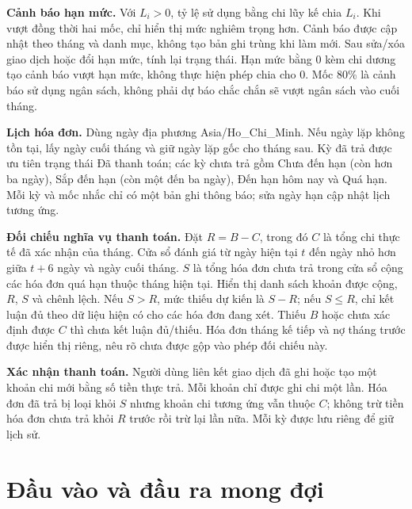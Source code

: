 \documentclass[11pt,a4paper]{article}
\begin{document}
\textbf{Cảnh báo hạn mức.} Với $L_i>0$, tỷ lệ sử dụng bằng chi lũy kế chia $L_i$. Khi vượt đồng thời hai mốc, chỉ hiển thị mức nghiêm trọng hơn. Cảnh báo được cập nhật theo tháng và danh mục, không tạo bản ghi trùng khi làm mới. Sau sửa/xóa giao dịch hoặc đổi hạn mức, tính lại trạng thái. Hạn mức bằng 0 kèm chi dương tạo cảnh báo vượt hạn mức, không thực hiện phép chia cho 0. Mốc 80\% là cảnh báo sử dụng ngân sách, không phải dự báo chắc chắn sẽ vượt ngân sách vào cuối tháng.

\textbf{Lịch hóa đơn.} Dùng ngày địa phương Asia/Ho\_Chi\_Minh. Nếu ngày lặp không tồn tại, lấy ngày cuối tháng và giữ ngày lặp gốc cho tháng sau. Kỳ đã trả được ưu tiên trạng thái Đã thanh toán; các kỳ chưa trả gồm Chưa đến hạn (còn hơn ba ngày), Sắp đến hạn (còn một đến ba ngày), Đến hạn hôm nay và Quá hạn. Mỗi kỳ và mốc nhắc chỉ có một bản ghi thông báo; sửa ngày hạn cập nhật lịch tương ứng.

\textbf{Đối chiếu nghĩa vụ thanh toán.} Đặt $R=B-C$, trong đó $C$ là tổng chi thực tế đã xác nhận của tháng. Cửa sổ đánh giá từ ngày hiện tại $t$ đến ngày nhỏ hơn giữa $t+6$ ngày và ngày cuối tháng. $S$ là tổng hóa đơn chưa trả trong cửa sổ cộng các hóa đơn quá hạn thuộc tháng hiện tại. Hiển thị danh sách khoản được cộng, $R$, $S$ và chênh lệch. Nếu $S>R$, mức thiếu dự kiến là $S-R$; nếu $S\leq R$, chỉ kết luận đủ theo dữ liệu hiện có cho các hóa đơn đang xét. Thiếu $B$ hoặc chưa xác định được $C$ thì chưa kết luận đủ/thiếu. Hóa đơn tháng kế tiếp và nợ tháng trước được hiển thị riêng, nêu rõ chưa được gộp vào phép đối chiếu này.

\textbf{Xác nhận thanh toán.} Người dùng liên kết giao dịch đã ghi hoặc tạo một khoản chi mới bằng số tiền thực trả. Mỗi khoản chỉ được ghi chi một lần. Hóa đơn đã trả bị loại khỏi $S$ nhưng khoản chi tương ứng vẫn thuộc $C$; không trừ tiền hóa đơn chưa trả khỏi $R$ trước rồi trừ lại lần nữa. Mỗi kỳ được lưu riêng để giữ lịch sử.

\clearpage
\section{Đầu vào và đầu ra mong đợi}
\end{document}
